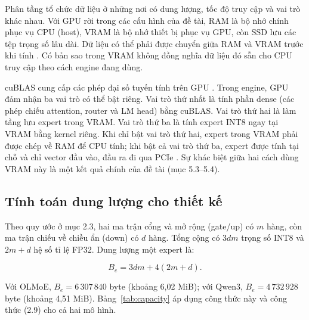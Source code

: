 Phân tầng tổ chức dữ liệu ở những nơi có dung lượng, tốc độ truy cập và vai trò khác nhau. Với GPU rời trong các cấu hình của đề tài, RAM là bộ nhớ chính phục vụ CPU (host), VRAM là bộ nhớ thiết bị phục vụ GPU, còn SSD lưu các tệp trọng số lâu dài. Dữ liệu có thể phải được chuyển giữa RAM và VRAM trước khi tính \cite{cuda_memory}. Có bản sao trong VRAM không đồng nghĩa dữ liệu đó sẵn cho CPU truy cập theo cách engine đang dùng.

cuBLAS cung cấp các phép đại số tuyến tính trên GPU \cite{nvidia_cublas}. Trong engine, GPU đảm nhận ba vai trò có thể bật riêng. Vai trò thứ nhất là tính phần dense (các phép chiếu attention, router và LM head) bằng cuBLAS. Vai trò thứ hai là làm tầng lưu expert trong VRAM. Vai trò thứ ba là tính expert INT8 ngay tại VRAM bằng kernel riêng. Khi chỉ bật vai trò thứ hai, expert trong VRAM phải được chép về RAM để CPU tính; khi bật cả vai trò thứ ba, expert được tính tại chỗ và chỉ vector đầu vào, đầu ra đi qua PCIe \cite{moe_tierengine_arch}. Sự khác biệt giữa hai cách dùng VRAM này là một kết quả chính của đề tài (mục 5.3--5.4).

\subsection{Tính toán dung lượng cho thiết kế}

Theo quy ước ở mục 2.3, hai ma trận cổng và mở rộng (gate/up) có $m$ hàng, còn ma trận chiếu về chiều ẩn (down) có $d$ hàng. Tổng cộng có $3dm$ trọng số INT8 và $2m+d$ hệ số tỉ lệ FP32. Dung lượng một expert là:

\begin{equation}
\label{eq:2.10}
B_e=3dm+4(2m+d).
\end{equation}

Với OLMoE, $B_e=6\,307\,840$ byte (khoảng 6,02 MiB); với Qwen3, $B_e=4\,732\,928$ byte (khoảng 4,51 MiB). Bảng~\ref{tab:capacity} áp dụng công thức này và công thức (2.9) cho cả hai mô hình.

